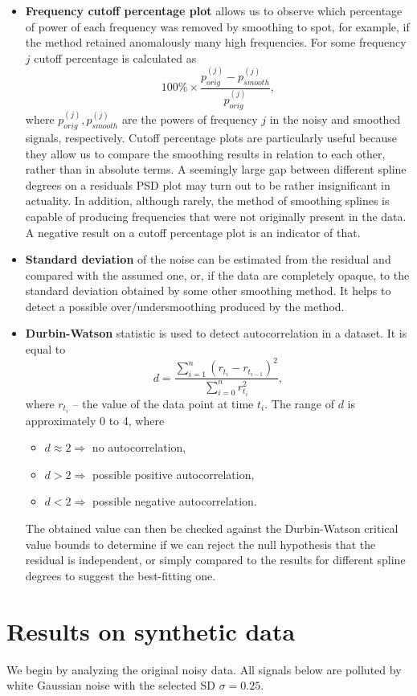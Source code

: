 \documentclass[11pt,leqno]{book}
\theoremstyle{definition}
\theoremstyle{plain}
\theoremstyle{definition}
\begin{document}
{\begin{itemize}
    \item \textbf{Frequency cutoff percentage plot} allows us to observe which percentage of power of each frequency was removed by smoothing to spot, for example, if the method retained anomalously many high frequencies. For some frequency $j$ cutoff percentage is calculated as \[100\%\times \frac{{p}_{orig}^{(j)}-{p}_{smooth}^{(j)}}{{p}_{orig}^{(j)}},\] 
    where ${p}_{orig}^{(j)}, {p}_{smooth}^{(j)}$ are the powers of frequency $j$ in the noisy and smoothed signals, respectively. Cutoff percentage plots are particularly useful because they allow us to compare the smoothing results in relation to each other, rather than in absolute terms. A seemingly large gap between different spline degrees on a residuals PSD plot may turn out to be rather insignificant in actuality. In addition, although rarely, the method of smoothing splines is capable of producing frequencies that were not originally present in the data. A negative result on a cutoff percentage plot is an indicator of that.
    \item \textbf{Standard deviation} of the noise can be estimated from the residual and compared with the assumed one, or, if the data are completely opaque, to the standard deviation obtained by some other smoothing method. It helps to detect a possible over/undersmoothing produced by the method. 
    \item \textbf{Durbin-Watson} statistic is used to detect autocorrelation in a dataset. It is equal to
    \[d=\frac{\sum_{i=1}^{n}\left(r_{t_i}-r_{t_{i-1}}\right)^{2}}{\sum_{i=0}^{n} r_{t_i}^{2}},\] where $r_{t_i}$ -- the value of the data point at time $t_i$.
\noindent The range of $d$ is approximately 0 to 4, where 
\begin{itemize}
\item $d\approx2\Rightarrow$ no autocorrelation,
\item $d>2\Rightarrow$ possible positive autocorrelation,
\item $d<2\Rightarrow$ possible negative autocorrelation.
\end{itemize}
The obtained value can then be checked against the Durbin-Watson critical value bounds to determine if we can reject the null hypothesis that the residual is independent, or simply compared to the results for different spline degrees to suggest the best-fitting one.
\end{itemize}
\section{Results on synthetic data}
We begin by analyzing the original noisy data. All signals below are polluted by white Gaussian noise with the selected SD $\sigma=0.25.$
}
\end{document}
